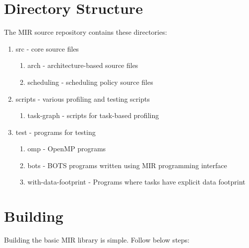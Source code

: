 \documentclass[11pt,a4paper,notitlepage]{report}
\begin{document}
\section{Directory Structure}
The MIR source repository contains these directories:
\begin{enumerate}[$\triangleright$]
\item src - core source files
\begin{enumerate}[$\triangleright$]
\item arch - architecture-based source files
\item scheduling - scheduling policy source files
\end{enumerate}
\item scripts - various profiling and testing scripts
\begin{enumerate}[$\triangleright$]
\item task-graph - scripts for task-based profiling
\end{enumerate}
\item test - programs for testing 
\begin{enumerate}[$\triangleright$]
\item omp - OpenMP programs
\item bots - BOTS programs written using MIR programming interface
\item with-data-footprint - Programs where tasks have explicit data footprint 
\end{enumerate}
\end{enumerate}

\section{Building}
Building the basic MIR library is simple. Follow below steps:
\end{document}
